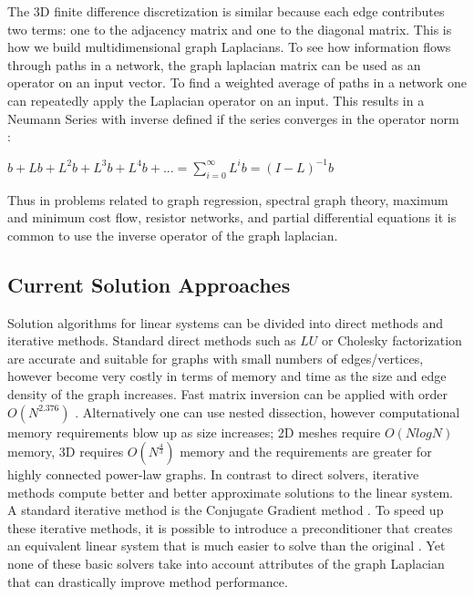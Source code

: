 \documentclass{article}
\begin{document}
The 3D finite difference discretization is similar because each edge contributes two terms: one to the adjacency matrix and one to the diagonal matrix. This is how we build multidimensional graph Laplacians.
To see how information flows through paths in a network, the graph laplacian matrix can be used as an operator on an input vector. To find a weighted average of paths in a network one can repeatedly apply the Laplacian operator on an input. This results in a Neumann Series with inverse defined if the series converges in the operator norm \cite{Neumann:1877,Kantorovich:1982}:\\
\begin{center}
$b + Lb + L^{2}b + L^{3}b + L^{4}b + ... = \sum_{i = 0}^{\infty} L^{i}b = (I-L)^{-1}b$\\
\end{center}
Thus in problems related to graph regression, spectral graph theory, maximum and minimum cost flow, resistor networks, and partial differential equations it is common to use the inverse operator of the graph laplacian. \cite{Spielman:2010}

\subsection{Current Solution Approaches}
Solution algorithms for linear systems can be divided into direct methods and iterative methods. Standard direct methods such as $LU$ or Cholesky factorization are accurate and suitable for graphs with small numbers of edges/vertices, however become very costly in terms of memory and time as the size and edge density of the graph increases. Fast matrix inversion can be applied with order $O(N^{2.376})$ \cite{Spielman:2010}. Alternatively one can use nested dissection, however computational memory requirements blow up as size increases; 2D meshes require $O(N log N)$ memory, 3D requires $O(N^{\frac{4}{3}})$ memory and the requirements are greater for highly connected power-law graphs\cite{Khaira:1992}. In contrast to direct solvers, iterative methods compute better and better approximate solutions to the linear system. A standard iterative method is the Conjugate Gradient method \cite{Hestenes:1952}. To speed up these iterative methods, it is possible to introduce a preconditioner that creates an equivalent linear system that is much easier to solve than the original \cite{Saad:2003}. Yet none of these basic solvers take into account attributes of the graph Laplacian that can drastically improve method performance.
\end{document}
